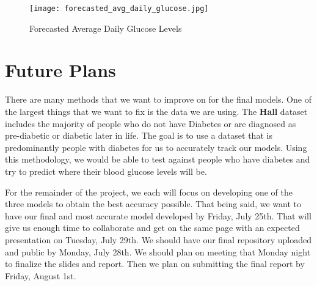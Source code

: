 \documentclass{article}
\begin{document}
\begin{figure}[h]
    \centering
    \texttt{[image: forecasted\_avg\_daily\_glucose.jpg]}
    \caption{Forecasted Average Daily Glucose Levels}
    \label{fig:forecasted_avg_daily_glucose}
\end{figure}

\newpage

\section*{Future Plans}

There are many methods that we want to improve on for the final models. One of the largest things that we want to fix is the data we are using. The \textbf{Hall} dataset \cite{Blood_Glucose_RNN} includes the majority of people who do not have Diabetes or are diagnosed as pre-diabetic or diabetic later in life. The goal is to use a dataset that is predominantly people with diabetes for us to accurately track our models. Using this methodology, we would be able to test against people who have diabetes and try to predict where their blood glucose levels will be. 

For the remainder of the project, we each will focus on developing one of the three models to obtain the best accuracy possible. That being said, we want to have our final and most accurate model developed by Friday, July 25th. That will give us enough time to collaborate and get on the same page with an expected presentation on Tuesday, July 29th. We should have our final repository uploaded and public by Monday, July 28th. We should plan on meeting that Monday night to finalize the slides and report. Then we plan on submitting the final report by Friday, August 1st.

\newpage



\end{document}
